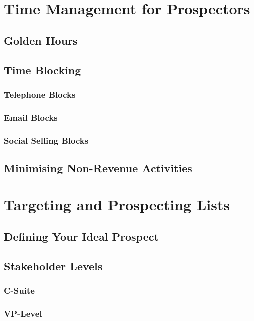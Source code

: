 \section{Time Management for Prospectors}\mbox{}
    \subsection{Golden Hours}\mbox{}
    \subsection{Time Blocking}\mbox{}
        \subsubsection{Telephone Blocks}\mbox{}
        \subsubsection{Email Blocks}\mbox{}
        \subsubsection{Social Selling Blocks}\mbox{}
    \subsection{Minimising Non-Revenue Activities}\mbox{}

\section{Targeting and Prospecting Lists}\mbox{}
    \subsection{Defining Your Ideal Prospect}\mbox{}
    \subsection{Stakeholder Levels}\mbox{}
        \subsubsection{C-Suite}\mbox{}
        \subsubsection{VP-Level}\mbox{}

